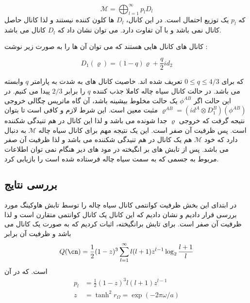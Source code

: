 \begin{equation} 
\mathcal{M} = \bigoplus_{l=1}^{\infty} p_l D_l
\end{equation}
که 
$p_l$
یک توزیع احتمال است. در این کانال، 
$D_l$
ها کلون کننده نیستند و لذا کانال حاصل کانال
نمی باشد و با آن تفاوت دارد. می توان نشان داد
\cite{qit}
که 
$D_l$
کانال 
می باشد.

کانال های 
کانال هایی هستند که می توان آن ها را به صورت زیر نوشت
\cite{chuang}
:

\begin{equation}
	D_1(\varrho) = (1-q) \varrho + \frac{q}{2} id_2
\end{equation}

که برای 
$ 0 \leq q \leq 4/3$
تعریف شده اند. خاصیت کانال های
به شدت به پارامتر 
$q$
وابسته می باشد. در حالت کانال سیاه چاله کاملا جذب کننده 
$q$
را برابر
$2/3$
پیدا می کنیم. در این حالت اگر 
$\phi^{AB}$
یک حالت مخلوط بیشینه باشد، آن گاه ماتریس چگالی خروجی 
$\varrho^{AB} = (id^A \otimes D_1 ^B ) (\phi^{AB})$
مثبت معین است. این شرط لازم و کافی است تا بتوان نتیجه گرفت
\cite{chuang}
که خروجی
$\varrho$
جدا شونده می باشد و لذا این کانال در هم تنیدگی شکننده است. پس ظرفیت آن صفر است. این یک نتیجه مهم برای کانال سیاه چاله 
$\mathcal{M}$
به دنبال دارد که خود
$\mathcal{M}$
هم یک کانال در هم تنیدگی  شکننده می باشد
\cite{qit}
و لذا ظرفیت آن صفر می باشد. پس از تابش های بر انگیخته در مود های دیر هنگام نمی توان اطلاعات مربوط به جسمی که به سمت سیاه چاله فرستاده شده است را بازیابی کرد.



\subsection{بررسی نتایج}
در ابتدای این بخش ظرفیت کوانتمی کانال سیاه چاله را توسط تابش هاوکینگ مورد بررسی قرار دادیم و نشان دادیم که این کانال یک کانال کوانتمی متقارن است و لذا ظرفیت آن صفر است. برای تابش برانگیخته، اثبات کردیم که به صورت یک کانال
می باشد و ظرفیت آن برابر 
\begin{equation}
Q(\cn) = \frac{1}{2} (1-z)^3 \sum_{l=1}^{\infty} l (l+1) z^{l-1} \log_2 \frac{l+1}{l}
\end{equation}
است. که در آن
\begin{align}
	p_l &= \frac{1}{2} (1-z)^3 l (l+1) z^{l-1} \\
	z &= \tanh^2 r_\Omega = \exp (-2\pi \omega /a )  
\end{align}

